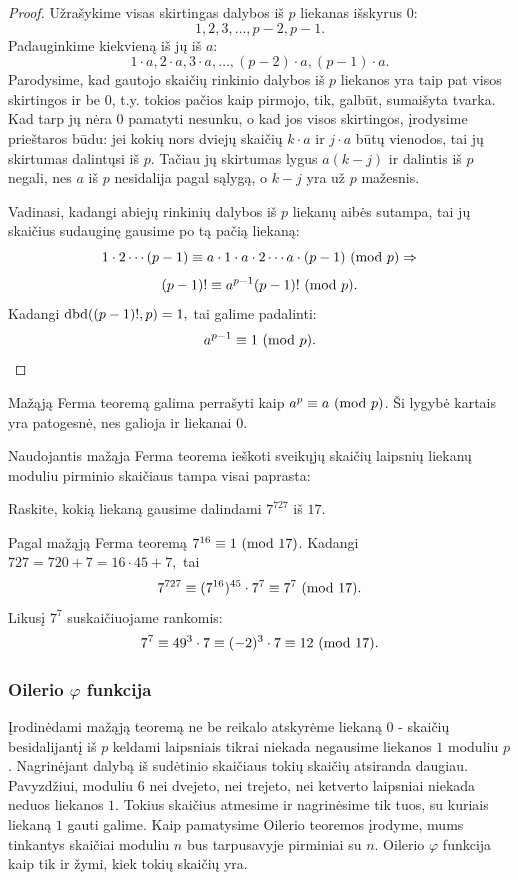 \begin{proof}
  Užrašykime visas skirtingas dalybos iš $p$ liekanas išskyrus $0$:
  $$1, 2, 3, \dots, p-2, p-1.$$
  Padauginkime kiekvieną iš jų iš $a$:
  $$1\cdot a, 2\cdot a, 3\cdot a, \dots, (p-2)\cdot a, (p-1)\cdot a.$$
  Parodysime, kad gautojo skaičių rinkinio dalybos iš $p$ liekanos yra taip
  pat visos skirtingos ir be 0, t.y. tokios pačios kaip pirmojo, tik, galbūt,
  sumaišyta tvarka. Kad tarp jų nėra 0 pamatyti nesunku, o kad jos visos
  skirtingos, įrodysime prieštaros būdu: jei kokių nors dviejų skaičių
  $k\cdot a$ ir $j\cdot a$ būtų vienodos, tai jų skirtumas dalintųsi iš
  $p$. Tačiau jų skirtumas lygus $a(k-j)$ ir dalintis iš $p$ negali, nes
  $a$ iš $p$ nesidalija pagal sąlygą, o $k-j$ yra už $p$ mažesnis. 

  Vadinasi, kadangi abiejų rinkinių dalybos iš $p$ liekanų aibės sutampa,
  tai jų skaičius sudauginę gausime po tą pačią liekaną:
  $$1\cdot 2 \cdots (p-1) \equiv a \cdot 1 \cdot a \cdot 2 \cdots a \cdot
  (p-1)\ (\text{mod } p)\Rightarrow$$
  $$(p-1)!\equiv a^{p-1}(p-1)!\ (\text{mod } p).$$
  Kadangi $\operatorname{dbd}((p-1)!,p)=1,$ tai galime padalinti:
  $$a^{p-1}\equiv 1 \ (\text{mod } p).$$
\end{proof}

\begin{pastaba}
  Mažąją Ferma teoremą galima perrašyti kaip $a^p \equiv a \ (\text{mod } p)$. Ši
  lygybė kartais yra patogesnė, nes galioja ir liekanai $0$.
\end{pastaba}
  
Naudojantis mažąja Ferma teorema ieškoti sveikųjų skaičių laipsnių liekanų
moduliu pirminio skaičiaus tampa visai paprasta:

\begin{pav}
  Raskite, kokią liekaną gausime dalindami $7^{727}$ iš $17$.
\end{pav}

Pagal mažąją Ferma teoremą $7^{16}\equiv 1 \ (\text{mod } 17)$. Kadangi $727 = 720 + 7
= 16\cdot 45 + 7,$ tai $$7^{727} \equiv (7^{16})^{45}\cdot 7^7\equiv 7^7
\ (\text{mod } 17).$$ Likusį $7^7$ suskaičiuojame rankomis: $$7^7 \equiv 49^3\cdot 7
\equiv (-2)^3\cdot 7\equiv 12 \ (\text{mod } 17).$$

\subsubsection{Oilerio $\varphi$ funkcija}

Įrodinėdami mažąją teoremą ne be reikalo atskyrėme liekaną $0$ - skaičių
besidalijantį iš $p$ keldami laipsniais tikrai niekada negausime liekanos
$1$ moduliu $p$. Nagrinėjant dalybą iš sudėtinio skaičiaus tokių skaičių
atsiranda daugiau. Pavyzdžiui, moduliu $6$ nei dvejeto, nei trejeto, nei
ketverto laipsniai niekada neduos liekanos $1$. Tokius skaičius atmesime ir
nagrinėsime tik tuos, su kuriais liekaną $1$ gauti galime. Kaip pamatysime Oilerio
teoremos įrodyme, mums tinkantys skaičiai moduliu $n$ bus tarpusavyje
pirminiai su $n$. Oilerio $\varphi$ funkcija kaip tik ir žymi, kiek tokių
skaičių yra.

